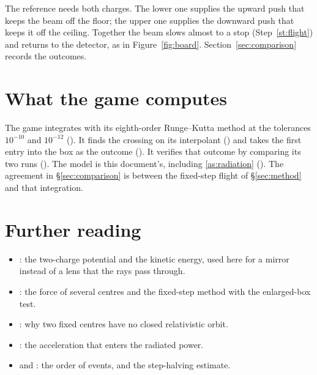 \documentclass{leveldoc}
\begin{document}
The reference needs both charges. The lower one supplies the upward push that keeps the
beam off the floor; the upper one supplies the downward push that keeps it off the
ceiling. Together the beam slows almost to a stop (Step~\ref{st:flight}) and returns
to the detector, as in Figure~\ref{fig:board}. Section~\ref{sec:comparison} records the
outcomes.

\section{What the game computes}\label{sec:engine}

The game integrates  with its eighth-order Runge--Kutta
method at the tolerances $10^{-10}$ and $10^{-12}$ (). It finds the crossing
on its interpolant () and takes the first entry into the box as the outcome
(). It verifies that outcome by comparing its two runs
(). The model is this document's, including \ref{as:radiation} ().
The agreement in §\ref{sec:comparison} is between the fixed-step flight of
§\ref{sec:method} and that integration.

\section{Further reading}\label{sec:reading}

\begin{itemize}
  \item {}: the two-charge potential and the kinetic energy, used
    here for a mirror instead of a lens that the rays pass through.
  \item {}: the force of several centres and the fixed-step
    method with the enlarged-box test.
  \item {}: why two fixed centres have no closed relativistic orbit.
  \item {}: the acceleration that enters the radiated power.
  \item {} and : the
    order of events, and the step-halving estimate.
\end{itemize}

\levelfileappendix
\end{document}
